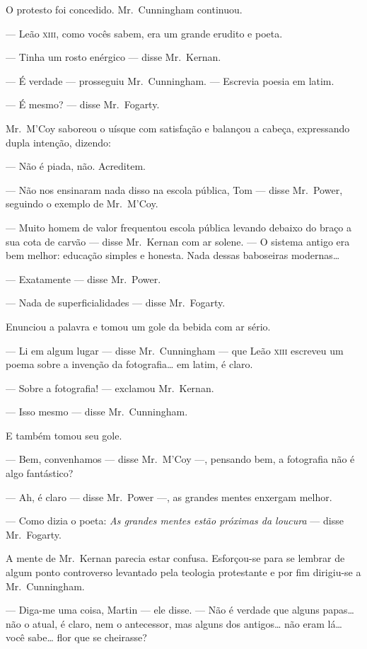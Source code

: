 O protesto foi concedido.  Mr.~Cunningham continuou.

--- Leão \textsc{xiii}, como vocês sabem, era um grande erudito e poeta.

--- Tinha um rosto enérgico --- disse Mr.~Kernan.

--- É verdade --- prosseguiu Mr.~Cunningham.  --- Escrevia poesia em latim.

--- É mesmo? --- disse Mr.~Fogarty.

Mr.~M’Coy saboreou o uísque com satisfação e balançou a cabeça, expressando
dupla intenção, dizendo:

--- Não é piada, não.  Acreditem.

--- Não nos ensinaram nada disso na escola pública, Tom --- disse Mr.~Power,
seguindo o exemplo de Mr.~M’Coy.

--- Muito homem de valor frequentou escola pública levando debaixo do braço a
sua cota de carvão --- disse Mr.~Kernan com ar solene.  --- O sistema antigo
era bem melhor: educação simples e honesta.  Nada dessas baboseiras
modernas\ldots{}

--- Exatamente --- disse Mr.~Power.

--- Nada de superficialidades --- disse Mr.~Fogarty.

Enunciou a palavra e tomou um gole da bebida com ar sério.

--- Li em algum lugar --- disse Mr.~Cunningham --- que Leão \textsc{xiii} escreveu um
poema sobre a invenção da fotografia\ldots{} em latim, é claro.

--- Sobre a fotografia! --- exclamou Mr.~Kernan.

--- Isso mesmo --- disse Mr.~Cunningham.

E também tomou seu gole.

--- Bem, convenhamos --- disse Mr.~M’Coy ---, pensando bem, a fotografia não é
algo fantástico?

--- Ah, é claro --- disse Mr.~Power ---, as grandes mentes enxergam melhor.

--- Como dizia o poeta: \textit{As grandes mentes estão próximas da
loucura} --- disse Mr.~Fogarty.

A mente de Mr.~Kernan parecia estar confusa.  Esforçou-se para se lembrar de
algum ponto controverso levantado pela teologia protestante e por fim
dirigiu-se a Mr.~Cunningham.

--- Diga-me uma coisa, Martin --- ele disse.  --- Não é verdade que alguns
papas\ldots{} não o atual, é claro, nem o antecessor, mas alguns dos
antigos\ldots{} não eram lá\ldots{} você sabe\ldots{} flor que se cheirasse?

